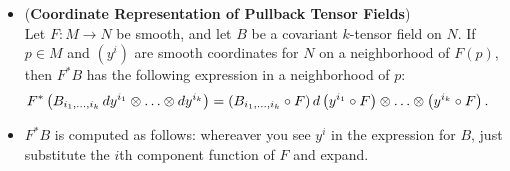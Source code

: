 \documentclass[11pt]{article}
\begin{document}
\begin{itemize}
\item \begin{corollary} (\textbf{Coordinate Representation of Pullback Tensor Fields})\\
Let $F: M \rightarrow N$  be smooth, and let $B$ be a covariant $k$-tensor field on $N$. If $p \in M$ and $(y^i)$ are smooth coordinates for $N$ on a neighborhood of $F(p)$, then $F^{*}B$ has the following expression in a neighborhood of $p$:
\begin{align*}
F^{*}\left(B_{i_1,\ldots,i_k}\,dy^{i_1} \otimes \ldots \otimes dy^{i_k}\right) &=  \left(B_{i_1,\ldots,i_k} \circ F\right) d\left(y^{i_1} \circ F\right) \otimes \ldots \otimes \left(y^{i_k} \circ F\right).
\end{align*}
\end{corollary}

\item \begin{remark}
$F^{*}B$ is computed as follows: whereaver you see $y^i$ in the expression for $B$, just substitute the $i$th component function of $F$ and expand.
\end{remark}
\end{itemize}
\end{document}

